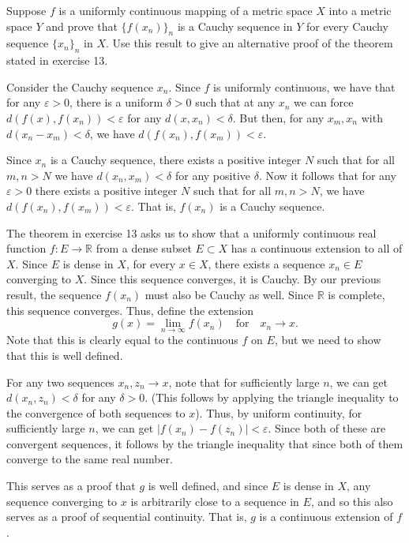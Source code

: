 \documentclass[12 pt, letterpaper]{hmcpset}
\begin{document}
\pagebreak

\begin{problem}
	Suppose $f$ is a uniformly continuous mapping of a metric space $X$ into a metric space $Y$ and prove that $\{ f(x_{n}) \}_{n}$ is a Cauchy sequence in $Y$ for every Cauchy sequence $\{ x_{n} \}_{n}$ in $X$. Use this result to give an alternative proof of the theorem stated in exercise 13.
\end{problem}

\begin{solution}
	Consider the Cauchy sequence $x_{n}$. Since $f$ is uniformly continuous, we have that for any $\varepsilon > 0$, there is a uniform $\delta > 0$ such that at any $x_{n}$ we can force $d(f(x), f(x_{n})) < \varepsilon$ for any $d(x, x_{n}) < \delta$. But then, for any $x_{m}, x_{n}$ with $d(x_{n} - x_{m}) < \delta$, we have $d(f(x_{n}), f(x_{m})) < \varepsilon$.

	Since $x_{n}$ is a Cauchy sequence, there exists a positive integer $N$ such that for all $m, n > N$ we have $d(x_{n}, x_{m}) < \delta$ for any positive $\delta$. Now it follows that for any $\varepsilon > 0$ there exists a positive integer $N$ such that for all $m, n > N$, we have $d(f(x_{n}), f(x_{m}))  < \varepsilon$. That is, $f(x_{n})$ is a Cauchy sequence.

	The theorem in exercise 13 asks us to show that a uniformly continuous real function $f : E \to \mathbb{R}$ from a dense subset $E \subset X$ has a continuous extension to all of $X$. Since $E$ is dense in $X$, for every $x \in X$, there exists a sequence $x_{n} \in E$ converging to $X$. Since this sequence converges, it is Cauchy. By our previous result, the sequence $f(x_{n})$ must also be Cauchy as well. Since $\mathbb{R}$ is complete, this sequence converges. Thus, define the extension
	\[
		g(x) = \lim_{n \to \infty} f(x_{n}) \quad \text{for} \quad x_{n} \to x.
	\]
	Note that this is clearly equal to the continuous $f$ on $E$, but we need to show that this is well defined. 

	For any two sequences $x_{n}, z_{n} \to x$, note that for sufficiently large $n$, we can get $d(x_{n}, z_{n}) < \delta$ for any $\delta > 0$. (This follows by applying the triangle inequality to the convergence of both sequences to $x$).  Thus, by uniform continuity, for sufficiently large $n$, we can get $\lvert f(x_{n}) - f(z_{n}) \rvert < \varepsilon$. Since both of these are convergent sequences, it follows by the triangle inequality that since both of them converge to the same real number.

	This serves as a proof that $g$ is well defined, and since $E$ is dense in $X$, any sequence converging to $x$ is arbitrarily close to a sequence in $E$, and so this also serves as a proof of sequential continuity. That is, $g$ is a continuous extension of $f$.
\end{solution}
\end{document}
